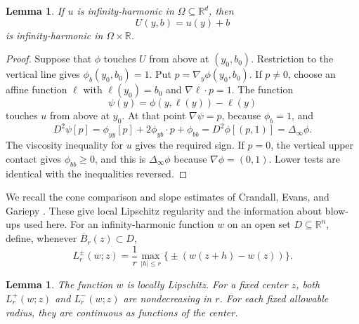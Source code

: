 \documentclass[11pt]{article}
\numberwithin{equation}{section}
\newtheorem{lemma}[theorem]{Lemma}
\theoremstyle{definition}
\theoremstyle{remark}
\newcommand{\R}{\mathbb{R}}
\newcommand{\Dinf}{\Delta_{\infty}}
\begin{document}
\begin{lemma}\label{lem:linear-lift}
If $u$ is infinity-harmonic in $\Omega\subseteq\R^d$, then
\[
  U(y,b)=u(y)+b
\]
is infinity-harmonic in $\Omega\times\R$.
\end{lemma}

\begin{proof}
Suppose that $\phi$ touches $U$ from above at $(y_0,b_0)$. Restriction to the vertical line gives $\phi_b(y_0,b_0)=1$. Put $p=\nabla_y\phi(y_0,b_0)$. If $p\ne0$, choose an affine function $\ell$ with $\ell(y_0)=b_0$ and $\nabla\ell\cdot p=1$. The function
\[
  \psi(y)=\phi(y,\ell(y))-\ell(y)
\]
touches $u$ from above at $y_0$. At that point $\nabla\psi=p$, because $\phi_b=1$, and
\[
  D^2\psi[p]
  =\phi_{yy}[p]+2\phi_{yb}\cdot p+\phi_{bb}
  =D^2\phi[(p,1)]=\Dinf\phi.
\]
The viscosity inequality for $u$ gives the required sign. If $p=0$, the vertical upper contact gives $\phi_{bb}\ge0$, and this is $\Dinf\phi$ because $\nabla\phi=(0,1)$. Lower tests are identical with the inequalities reversed.
\end{proof}

We recall the cone comparison and slope estimates of Crandall, Evans, and Gariepy \cite{CrandallEvansGariepy2001}. These give local Lipschitz regularity and the information about blow-ups used here. For an infinity-harmonic function $w$ on an open set $D\subseteq\R^n$, define, whenever $\overline B_r(z)\subset D$,
\[
  L_r^\pm(w;z)=\frac1r\max_{|h|\le r}\bigl\{\pm(w(z+h)-w(z))\bigr\}.
\]

\begin{lemma}\label{lem:cone-slopes}
The function $w$ is locally Lipschitz. For a fixed center $z$, both $L_r^+(w;z)$ and $L_r^-(w;z)$ are nondecreasing in $r$. For each fixed allowable radius, they are continuous as functions of the center.
\end{lemma}
\end{document}
